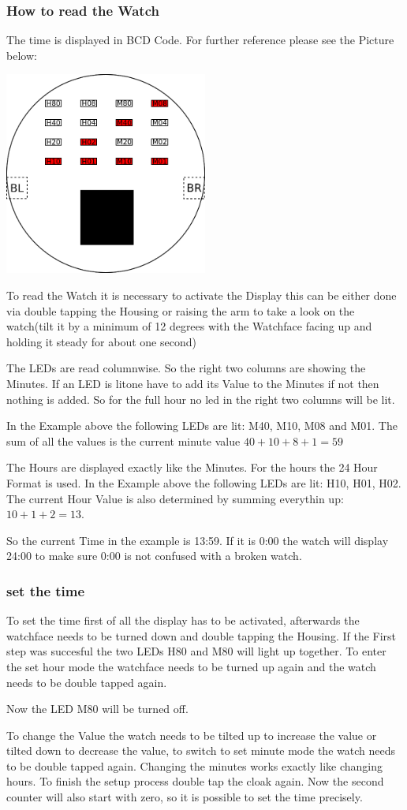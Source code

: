 \subsubsection{How to read the Watch}
The time is displayed in BCD Code. For further reference please see the Picture below:
\begin{center}
  \includegraphics[width=0.5\textwidth]{drawings/BinDia1359.png}
\label{fig:BinWatchFace}
\end{center}
To read the Watch it is necessary to activate the Display this can be either done via double tapping the Housing or raising the arm to take a look on the watch(tilt it by a minimum of 12 degrees with the Watchface facing up and holding it steady for about one second)

The LEDs are read columnwise. So the right two columns are showing the Minutes. If an LED is litone have to add its Value to the Minutes if not then nothing is added. So for the full hour no led in the right two columns will be lit.

In the Example above the following LEDs are lit: M40, M10, M08 and M01.
The sum of all the values is the current minute value $40+10+8+1=59$

The Hours are displayed exactly like the Minutes. For the hours the 24 Hour Format is used. In the Example above the following LEDs are lit: H10, H01, H02. The current Hour Value is also determined by summing everythin up: $10+1+2=13$.

So the current Time in the example is 13:59. If it is 0:00 the watch will display 24:00 to make sure 0:00 is not confused with a broken watch.
\subsubsection{set the time}
To set the time first of all the display has to be activated, afterwards the watchface needs to be turned down and double tapping the Housing.
If the First step was succesful the two LEDs H80 and M80 will light up together. To enter the set hour mode the watchface needs to be turned up again and the watch needs to be double tapped again.

Now the LED M80 will be turned off.

To change the Value the watch needs to be tilted up to increase the value or tilted down to decrease the value, to switch to set minute mode the watch needs to be double tapped again. Changing the minutes works exactly like changing hours. To finish the setup process double tap the cloak again. Now the second counter will also start with zero, so it is possible to set the time precisely.